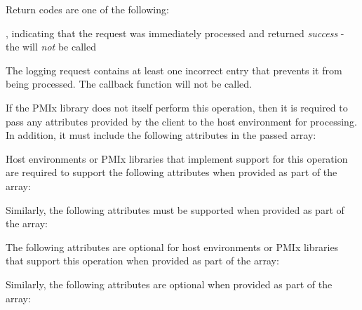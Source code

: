 Return codes are one of the following:

\returnsimplenb

\returnstart
\begin{constantdesc}
\item {}, indicating that the request was immediately processed and returned \textit{success} - the  will \textit{not} be called
\item {} The logging request contains at least one incorrect entry that prevents it from being processed. The callback function will not be called.
\end{constantdesc}
\returnend

\reqattrstart
If the \ac{PMIx} library does not itself perform this operation, then it is required to pass any attributes provided by the client to the host environment for processing. In addition, it must include the following attributes in the passed  array:


Host environments or \ac{PMIx} libraries that implement support for this operation are required to support the following attributes when provided as part of the  array:


Similarly, the following attributes must be supported when provided as part of the  array:


\reqattrend

\optattrstart
The following attributes are optional for host environments or \ac{PMIx} libraries that support this operation when provided as part of the  array:


Similarly, the following attributes are optional when provided as part of the  array:




